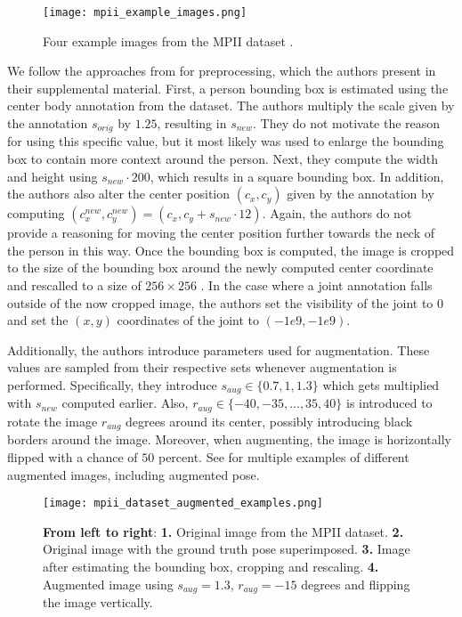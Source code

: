 \begin{figure}[htb!]
    \centering
    \texttt{[image: mpii\_example\_images.png]}
    \caption{Four example images from the MPII dataset \cite{andriluka_2d_2014}. }
    \label{fig:mpii_example_images}
\end{figure}

We follow the approaches from \cite{luvizon_2d/3d_2018} for preprocessing, which the authors present in their supplemental material.
First, a person bounding box is estimated using the center body annotation from the dataset.
The authors multiply the scale given by the annotation $s_{orig}$ by $1.25$, resulting in $s_{new}$.
They do not motivate the reason for using this specific value, but it most likely was used to enlarge the bounding box to contain more context around the person.
Next, they compute the width and height using $s_{new} \cdot 200$, which results in a square bounding box.
In addition, the authors also alter the center position $(c_x,  c_y)$ given by the annotation by computing $(c_{x}^{new}, c_y^{new}) = (c_x, c_y + s_{new} \cdot 12)$.
Again, the authors do not provide a reasoning for moving the center position further towards the neck of the person in this way.
Once the bounding box is computed, the image is cropped to the size of the bounding box around the newly computed center coordinate and rescalled to a size of $256 \times 256$ .
In the case where a joint annotation falls outside of the now cropped image, the authors set the visibility of the joint to $0$ and set the $(x,y)$ coordinates of the joint to $(-1e9, -1e9)$.

Additionally, the authors introduce parameters used for augmentation.
These values are sampled from their respective sets whenever augmentation is performed.
Specifically, they introduce $s_{aug} \in \{0.7, 1, 1.3\}$ which gets multiplied with $s_{new}$ computed earlier.
Also, $r_{aug} \in \{-40, -35, \dots, 35, 40\}$ is introduced to rotate the image $r_{aug}$ degrees around its center, possibly introducing black borders around the image.
Moreover, when augmenting, the image is horizontally flipped with a chance of $50$ percent.
See  for multiple examples of different augmented images, including augmented pose.

\begin{figure}[htb!]
    \centering
    \texttt{[image: mpii\_dataset\_augmented\_examples.png]}
    \caption{\textbf{From left to right}: \textbf{1.} Original image from the MPII dataset. \textbf{2.} Original image with the ground truth pose superimposed. \textbf{3.} Image after estimating the bounding box, cropping and rescaling. \textbf{4.} Augmented image using $s_{aug} = 1.3$, $r_{aug} = -15$ degrees and flipping the image vertically.}
    \label{fig:mpii_example_augmentation}
\end{figure}

